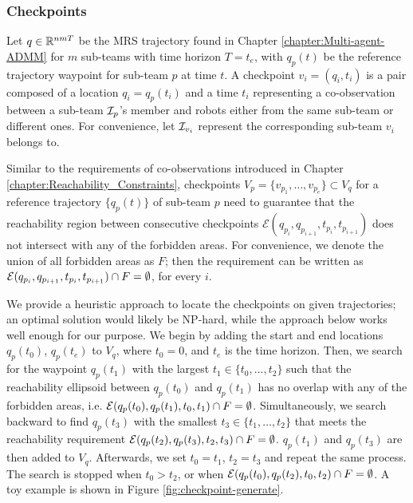 \documentclass[journal]{IEEEtran}  %
\begin{document}
\subsubsection{Checkpoints}\label{sec:security-checkpoint}
Let $q\in\mathbb{R}^{nmT}{}$ be the MRS trajectory found in Chapter \ref{chapter:Multi-agent-ADMM} for $m$ sub-teams with time horizon $T=t_{e}$, with $q_{p}(t)$ be the reference trajectory waypoint for sub-team $p$ at time $t$. A checkpoint $v_i=(q_{i},t_{i})$ is a pair composed of a location $q_{i}=q_{p}(t_{i})$ and a time $t_{i}$ representing a co-observation between a sub-team $\mathcal{I}_p$'s member and robots either from the same sub-team or different ones. For convenience, let $\mathcal{I}_{v_{i}}$ represent the corresponding sub-team $v_{i}$ belongs to. 

Similar to the requirements of co-observations introduced in Chapter \ref{chapter:Reachability_Constraints}, checkpoints $V_{p}=\{ v_{p_{1}}, \dots ,v_{p_{e}}\} \subset V_{q}$ for a reference trajectory $\{q_{p}(t)\}$ of sub-team $p$ need to guarantee that the reachability region between consecutive checkpoints $\mathcal{E}(q_{p_{i}}, q_{p_{i+1}}, t_{p_{i}},t_{p_{i+1}})$ does not intersect with any of the forbidden areas. For convenience, we denote the union of all forbidden areas as $F$; then the requirement can be written as $\mathcal{E}(q_{p_{i}}, q_{p_{i+1}}, t_{p_{i}},t_{p_{i+1}}) \cap F = \emptyset$, for every $i$. 

We provide a heuristic approach to locate the checkpoints on given trajectories; an optimal solution would likely be NP-hard, while the approach below works well enough for our purpose. We begin by adding the start and end locations $q_{p}(t_{0})$, $q_{p}(t_{e})$ to $V_{q}$, where $t_{0}=0$, and $t_{e}$ is the time horizon. Then, we search for the waypoint $q_{p}(t_{1})$ with the largest $t_{1} \in \{t_{0}, \dots ,t_{2}\}$ such that the reachability ellipsoid between $q_{p}(t_{0})$ and $q_{p}(t_{1})$ has no overlap with any of the forbidden areas, i.e. $\mathcal{E}(q_{p}(t_{0}),q_{p}(t_{1}), t_{0},t_{1})\cap F = \emptyset$. Simultaneously, we search backward to find $q_{p}(t_{3})$ with the smallest $t_{3}\in \{t_{1}, \dots ,t_{2}\} $ that meets the reachability requirement $\mathcal{E}(q_{p}(t_{2}),q_{p}(t_{3}),t_{2},t_{3}) \cap F = \emptyset$. $q_{p}(t_{1})$ and $q_{p}(t_{3})$ are then added to $V_{q}$. Afterwards, we set $t_{0}=t_{1}$, $t_{2}=t_{3}$ and repeat the same process. The search is stopped when $t_{0}>t_{2}$, or when $\mathcal{E}(q_{p}(t_{0}),q_{p}(t_{2}),t_{0},t_{2}) \cap F = \emptyset$. A toy example is shown in Figure \ref{fig:checkpoint-generate}. 
\end{document}
